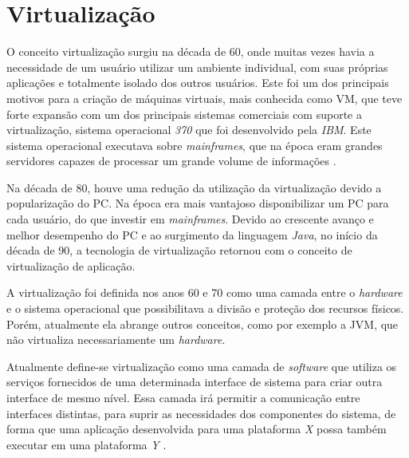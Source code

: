 \chapter{Virtualização}
\label{cap:virtualizacao}

O conceito virtualização surgiu na década de 60, onde muitas vezes havia a necessidade de um usuário utilizar um ambiente individual, 
com suas próprias aplicações e totalmente isolado dos outros usuários. Este foi um dos principais motivos para a criação de máquinas 
virtuais, mais conhecida como \ac{VM}, que teve forte expansão com um dos principais sistemas comerciais com suporte a virtualização, 
sistema operacional \textit{370} que foi desenvolvido pela \textit{IBM}. Este sistema operacional executava sobre \textit{mainframes}, 
que na época eram grandes servidores capazes de processar um grande volume de informações \cite{laureano2008}. 

Na década de 80, houve uma redução da utilização da virtualização devido a popularização do \ac{PC}. Na época era mais vantajoso disponibilizar 
um \ac{PC} para cada usuário, do que investir em \textit{mainframes}. Devido ao crescente avanço e melhor desempenho do \ac{PC} e
ao surgimento da linguagem \textit{Java}, no início da década de 90, a tecnologia de virtualização retornou com o conceito de virtualização
de aplicação.

A virtualização foi definida nos anos 60 e 70 como uma camada entre o \textit{hardware} e o sistema operacional que possibilitava a 
divisão e proteção dos recursos físicos. Porém, atualmente ela abrange outros conceitos, como por exemplo a \ac{JVM}, que não virtualiza
necessariamente um \textit{hardware}. 

Atualmente define-se virtualização como uma camada de \textit{software} que utiliza os serviços fornecidos de uma determinada interface de 
sistema para criar outra interface de mesmo nível. Essa camada irá permitir a comunicação entre interfaces distintas, para suprir as 
necessidades dos componentes do sistema, de forma que uma aplicação desenvolvida para uma plataforma \textit{X} possa também executar 
em uma plataforma \textit{Y} \cite{laureano2008}.

